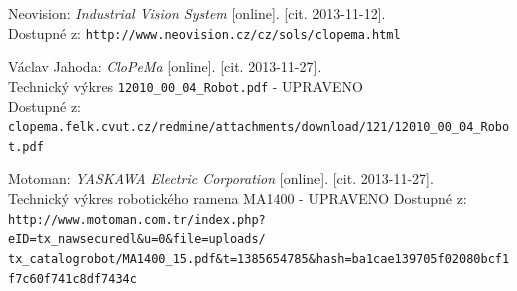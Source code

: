 \documentclass[10pt,a4paper,titlepage,oneside]{report}
\begin{document}

\begin{thebibliography}{CPM}    
   Neovision:
    \emph{Industrial Vision System} [online]. [cit. 2013-11-12].\\
    Dostupné z: \verb|http://www.neovision.cz/cz/sols/clopema.html|    
  
   Václav Jahoda:
    \emph{CloPeMa} [online]. [cit. 2013-11-27].\\
    Technický výkres \verb|12010_00_04_Robot.pdf| - UPRAVENO\\
    Dostupné z: \verb|clopema.felk.cvut.cz/redmine/attachments/download/121/12010_00_04_Robot.pdf|    
    
   Motoman:
    \emph{YASKAWA Electric Corporation} [online]. [cit. 2013-11-27].\\
    Technický výkres robotického ramena MA1400 - UPRAVENO
    Dostupné z: \verb|http://www.motoman.com.tr/index.php?eID=tx_nawsecuredl&u=0&file=uploads/|\\
    \verb|tx_catalogrobot/MA1400_15.pdf&t=1385654785&hash=ba1cae139705f02080bcf1f7c60f741c8df7434c| 
\end{thebibliography}
\end{document}
